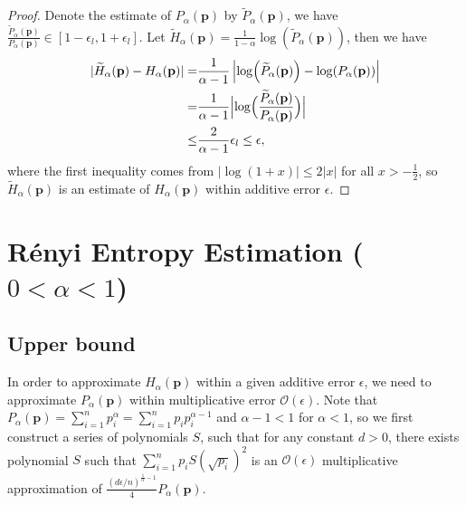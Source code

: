 \documentclass[journal]{IEEEtran}
\begin{document}
\begin{proof}
Denote the estimate of $P_{\alpha}(\mathbf{p})$ by $\widetilde{P}_{\alpha}(\mathbf{p})$, we have $\frac{\widetilde{P}_{\alpha}(\mathbf{p})}{P_{\alpha}(\mathbf{p})}\in[1-\epsilon_l,1+\epsilon_l]$. Let $\widetilde{H}_\alpha(\mathbf{p})=\frac{1}{1-\alpha}\log(\widetilde{P}_{\alpha}(\mathbf{p}))$, then we have
\begin{align}
    |\widetilde{H}_\alpha(\mathbf{p})-H_\alpha(\mathbf{p})|
    = & \frac{1}{\alpha-1}\left|\log(\widetilde{P}_{\alpha}(\mathbf{p}))-\log(P_{\alpha}(\mathbf{p}))\right| \nonumber \\
    = & \frac{1}{\alpha-1}\Bigl|\log\Bigl(\frac{\widetilde{P}_\alpha(\mathbf{p})}{P_\alpha(\mathbf{p})}\Bigr)\Bigr| \nonumber \\
    \le & \frac{2}{\alpha-1}\epsilon_l \le \epsilon,
\end{align}
where the first inequality comes from $|\log(1+x)| \le 2|x|$ for all $x > -\frac{1}{2}$, so $\widetilde{H}_\alpha(\mathbf{p})$ is an estimate of $H_\alpha(\mathbf{p})$ within additive error $\epsilon$.
\end{proof}







\section{R{\'e}nyi Entropy Estimation ($0<\alpha<1$)}\label{sec:alpha-small}
\subsection{Upper bound}



\noindent
In order to approximate $H_{\alpha}(\mathbf{p}) $ within a given additive error $\epsilon$, we need to approximate $P_{\alpha}(\mathbf{p})$ within multiplicative error $\mathcal{O}(\epsilon)$. Note that $P_{\alpha}(\mathbf{p}) = \sum_{i=1}^n p_i ^{\alpha} = \sum_{i=1}^n p_i p_i^{\alpha-1}$ and $\alpha-1 < 1$ for $\alpha < 1$, so we first construct a series of polynomials $S$, such that for any constant $d > 0$, there exists polynomial $S$ such that $\sum_{i=1}^n p_iS(\sqrt{p_i})^2$ is an $\mathcal{O}(\epsilon)$ multiplicative approximation of $\frac{(d\epsilon/n)^{\frac{1}{\alpha}-1}}{4} P_{\alpha}(\mathbf{p})$. 
\end{document}

